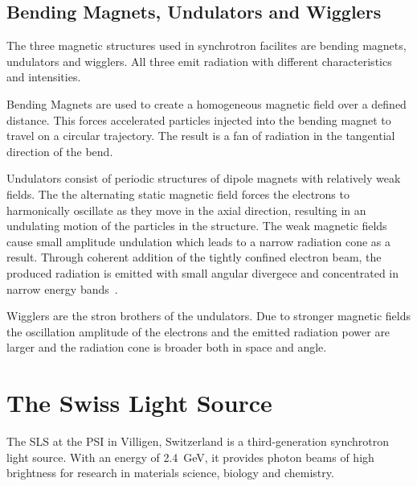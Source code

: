 \subsection{Bending Magnets, Undulators and Wigglers}
The three magnetic structures used in synchrotron facilites are bending magnets, undulators and wigglers. All three emit radiation with different characteristics and intensities.

Bending Magnets are used to create a homogeneous magnetic field over a defined distance. This forces accelerated particles injected into the bending magnet to travel on a circular trajectory. The result is a fan of radiation in the tangential direction of the bend.

Undulators consist of periodic structures of dipole magnets with relatively weak fields. The the alternating static magnetic field forces the electrons to harmonically oscillate as they move in the axial direction, resulting in an undulating motion of the particles in the structure. The weak magnetic fields cause small amplitude undulation which leads to a narrow radiation cone as a result. Through coherent addition of the tightly confined electron beam, the produced radiation is emitted with small angular divergece and concentrated in narrow energy bands~\cite{Stampanoni2002a}.

Wigglers are the stron brothers of the undulators. Due to stronger magnetic fields the oscillation amplitude of the electrons and the emitted radiation power are larger and the radiation cone is broader both in space and angle.


\section{The Swiss Light Source}
The \ac{SLS} at the \ac{PSI} in Villigen, Switzerland is a third-generation synchrotron light source. With an energy of \SI{2.4}{\giga\electronvolt}, it provides photon beams of high brightness for research in materials science, biology and chemistry.

